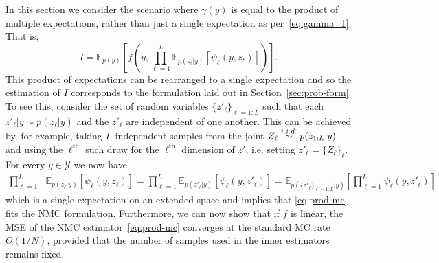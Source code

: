 In this section we consider the scenario  where $\gamma (y)$ is equal to the product of 
multiple expectations, rather than just a single expectation as per~\eqref{eq:gamma_1}.
That is,
\begin{equation}
\label{eq:prod-mc}
I = \mathbb{E}_{p(y)}\left[ f\left(y,\prod_{\ell=1}^{L}\mathbb{E}_{p(z_{\ell}|y)}\left[\psi_{\ell}(y,z_{\ell})\right]\right) \right].
\end{equation}
This product of expectations can be rearranged to a single expectation and so the estimation of $I$ 
corresponds to the formulation laid out in Section~\ref{sec:prob-form}. To see this, consider the set of 
random variables $\{z'_{\ell}\}_{\ell=1:L}$ such that each 
$z'_{\ell}|y \sim p(z_\ell | y)$ and the $z'_{\ell}$ are independent of one another. 
This can be achieved by, for example, taking $L$ independent samples from the joint $Z_{\ell} \overset{i.i.d.}{\sim} p(z_{1:L} | y)$ 
and using the $\ell^{\mathrm{th}}$ such draw for the $\ell^{\mathrm{th}}$ dimension of $z'$, i.e.
setting $z'_{\ell}= \{Z_{\ell}\}_{\ell}$.
For every $y \in \mathcal{Y}$ we now have
\begin{align*}
 \prod_{\ell=1}^{L}&\mathbb{E}_{p(z_{\ell}|y)}[\psi_{\ell}(y,z_{\ell})] =  \prod_{\ell=1}^{L}\mathbb{E}_{p(z'_{\ell}|y)}[\psi_{\ell}(y,z'_{\ell})]
  = \mathbb{E}_{p(\{z'_{\ell}\}_{\ell=1:L}|y)}\left[ \prod_{\ell=1}^{L} \psi_{\ell}(y,z'_{\ell}) \right]
\end{align*}
which is a single expectation on an extended space and implies that \eqref{eq:prod-mc} 
fits the NMC formulation.
Furthermore, we can now show that if $f$ is linear, the MSE of the NMC estimator~\eqref{eq:prod-mc}
converges at the standard MC rate $O(1/N)$, provided that 
the number of samples used in the inner estimators remains fixed.  


